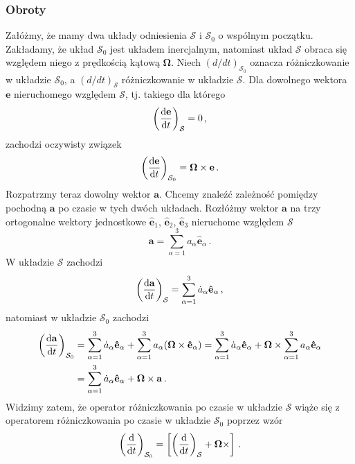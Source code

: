 \documentclass[../main.tex]{subfiles}
\begin{document}
\subsubsection{Obroty}
Załóżmy, że mamy dwa układy odniesienia \(\mathcal{S}\) i \(\mathcal{S}_0\) o wspólnym początku.
Zakładamy, że układ \(\mathcal{S}_0\) jest układem inercjalnym, natomiast układ \(\mathcal{S}\)
obraca się względem niego z prędkością kątową \(\boldsymbol{\Omega}\). Niech
\((d/dt)_{\mathcal{S}_0}\) oznacza różniczkowanie w układzie \(\mathcal{S}_0\), a
\((d/dt)_{\mathcal{S}}\) różniczkowanie w układzie \(\mathcal{S}\). Dla dowolnego wektora
\(\mathbf{e}\) nieruchomego względem \(\mathcal{S}\), tj. takiego dla którego
\begin{equation*}
    \left(\dv{\mathbf{e}}{t}\right)_{\mathcal{S}}=0\,,
\end{equation*}
zachodzi oczywisty związek
\begin{equation*}
    \left(\dv{\mathbf{e}}{t}\right)_{\mathcal{S}_0}=\boldsymbol{\Omega}\times\mathbf{e}\,.
\end{equation*}
Rozpatrzmy teraz dowolny wektor \(\mathbf{a}\). Chcemy znaleźć zależność pomiędzy pochodną
\(\mathbf{a}\) po czasie w tych dwóch układach. Rozłóżmy wektor \(\mathbf{a}\) na trzy ortogonalne
wektory jednostkowe \(\mathbf{\hat e}_1\), \(\mathbf{\hat e}_2\), \(\mathbf{\hat e}_3\) nieruchome
względem \(\mathcal{S}\)
\begin{equation*}
    \mathbf{a}=\sum_{\alpha=1}^3a_\alpha\mathbf{\hat e}_\alpha\,.
\end{equation*}
W układzie \(\mathcal{S}\) zachodzi
\begin{equation*}
    \left(\dv{\mathbf{a}}{t}\right)_\mathcal{S}=\sum_{\alpha=1}^3\dot a_\alpha\mathbf{\hat e}_\alpha\,,
\end{equation*}
natomiast w układzie \(\mathcal{S}_0\) zachodzi
\begin{equation*}
\begin{split}
    \left(\dv{\mathbf{a}}{t}\right)_{\mathcal{S}_0}&=\sum_{\alpha=1}^3\dot a_\alpha\mathbf{\hat e}_\alpha+\sum_{\alpha=1}^3a_\alpha (\boldsymbol{\Omega}\times\mathbf{\hat e}_\alpha)=\sum_{\alpha=1}^3\dot a_\alpha\mathbf{\hat e}_\alpha+\boldsymbol{\Omega}\times\sum_{\alpha=1}^3 a_\alpha\mathbf{\hat e}_\alpha\\
    &=\sum_{\alpha=1}^3\dot a_\alpha\mathbf{\hat e}_\alpha+\boldsymbol{\Omega}\times\mathbf{a}\,.
\end{split}
\end{equation*}
Widzimy zatem, że operator różniczkowania po czasie w układzie \(\mathcal{S}\) wiąże się z
operatorem różniczkowania po czasie w układzie \(\mathcal{S}_0\) poprzez wzór
\begin{equation*}
    \left(\dv{}{t}\right)_{\mathcal{S}_0}=\left[\left(\dv{}{t}\right)_\mathcal{S}+\boldsymbol{\Omega}\times\right]\,.
\end{equation*}
\end{document}
